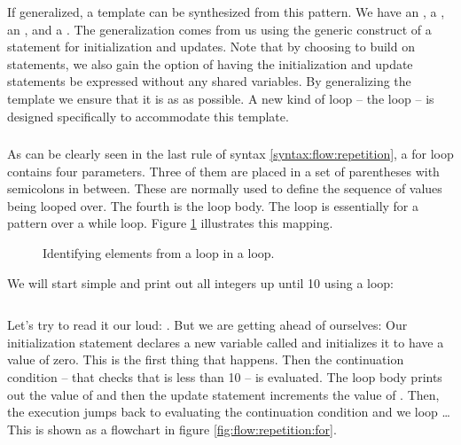 If generalized, a template can be synthesized from this pattern. We have an , a , an , and a . The generalization comes from us using the generic construct of a statement for initialization and updates. Note that by choosing to build on statements, we also gain the option of having the initialization and update statements be expressed without any shared variables. By generalizing the template we ensure that it is as  as possible. A new kind of loop -- the  loop -- is designed specifically to accommodate this template.

\subsubsection{\csharp}

As can be clearly seen in the last rule of syntax \ref{syntax:flow:repetition}, a for loop contains four parameters. Three of them are placed in a set of parentheses with semicolons in between. These are normally used to define the sequence of values being looped over. The fourth is the loop body. The  loop is essentially  for a pattern over a while loop. Figure \ref{fig:flow:repetition:for:pattern} illustrates this mapping.

\begin{figure}[tbp]
  
  \caption{Identifying elements from a  loop in a  loop.}
  \label{fig:flow:repetition:for:pattern}
\end{figure}

We will start simple and print out all integers up until 10 using a  loop:

\inputminted[linenos]{csharp}{../src/csharp/flow_repetition/for/Program.cs}

Let's try to read it our loud: . But we are getting ahead of ourselves: Our initialization statement declares a new variable called  and initializes it to have a value of zero. This is the first thing that happens. Then the continuation condition -- that checks that  is less than 10 -- is evaluated. The loop body prints out the value of  and then the update statement increments the value of . Then, the execution jumps back to evaluating the continuation condition and we loop \ldots This is shown as a flowchart in figure \ref{fig:flow:repetition:for}.

